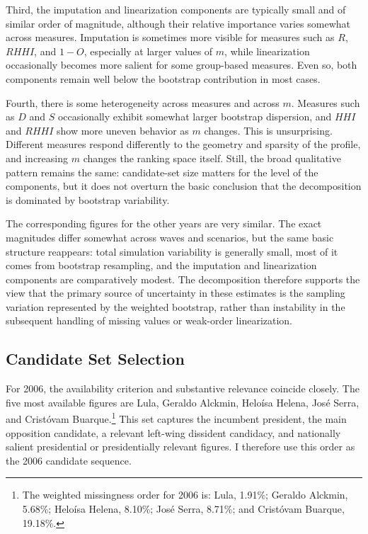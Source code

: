 \documentclass[12pt]{article}
\begin{document}
Third, the imputation and linearization components are typically small and of
similar order of magnitude, although their relative importance varies somewhat
across measures. Imputation is sometimes more visible for measures such as
\(R\), \(RHHI\), and \(1-O\), especially at larger values of \(m\), while
linearization occasionally becomes more salient for some group-based measures.
Even so, both components remain well below the bootstrap contribution in most
cases.

Fourth, there is some heterogeneity across measures and across \(m\). Measures
such as \(D\) and \(S\) occasionally exhibit somewhat larger bootstrap
dispersion, and \(HHI\) and \(RHHI\) show more uneven behavior as \(m\) changes.
This is unsurprising. Different measures respond differently to the geometry
and sparsity of the profile, and increasing \(m\) changes the ranking space
itself. Still, the broad qualitative pattern remains the same: candidate-set
size matters for the level of the components, but it does not overturn the
basic conclusion that the decomposition is dominated by bootstrap variability.

The corresponding figures for the other years are very similar. The exact
magnitudes differ somewhat across waves and scenarios, but the same basic
structure reappears: total simulation variability is generally small, most of
it comes from bootstrap resampling, and the imputation and linearization
components are comparatively modest. The decomposition therefore supports the
view that the primary source of uncertainty in these estimates is the sampling
variation represented by the weighted bootstrap, rather than instability in the
subsequent handling of missing values or weak-order linearization.

\subsection{Candidate Set Selection}
For 2006, the availability criterion and substantive relevance coincide closely.
The five most available figures are Lula, Geraldo Alckmin, Heloísa Helena, José
Serra, and Cristóvam Buarque.\footnote{The weighted missingness order for 2006
is: Lula, 1.91\%; Geraldo Alckmin, 5.68\%; Heloísa Helena, 8.10\%; José Serra,
8.71\%; and Cristóvam Buarque, 19.18\%.} This set captures the incumbent
president, the main opposition candidate, a relevant left-wing dissident
candidacy, and nationally salient presidential or presidentially relevant
figures. I therefore use this order as the 2006 candidate sequence.
\end{document}
